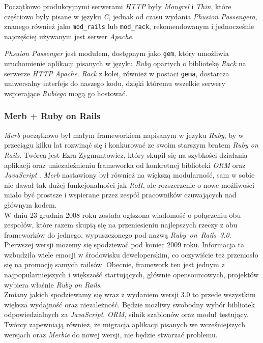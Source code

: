 \documentclass[a4paper,12pt]{article}
\begin{document}
Początkowo produkcyjnymi serwerami \emph{HTTP} były \emph{Mongrel} i \emph{Thin}, które
częściowo były pisane w języku \emph{C}, jednak od czasu wydania \emph{Phusion Passengera},
znanego również jako \texttt{mod\_rails} lub \texttt{mod\_rack}, rekomendowanym i
jednocześnie najczęściej używanym jest serwer \emph{Apache}.


\emph{Phsuion Passenger} jest modułem, dostępnym jako \texttt{gem}, który umożliwia
uruchomienie aplikacji pisanych w języku \emph{Ruby} opartych o bibliotekę \emph{Rack} na
serwerze \emph{HTTP} \emph{Apache}. \emph{Rack} z kolei, również w postaci \texttt{gema},
dostarcza uniwersalny interfejs do naszego kodu, dzięki któremu wszelkie serwery
wspierające \emph{Rubiego} mogą go hostować.


\subsubsection{Merb + Ruby on Rails}
\emph{Merb} początkowo był małym frameworkiem napisanym w języku \emph{Ruby}, by w
przeciągu kilku lat rozwinąć się i konkurować ze swoim starszym bratem \emph{Ruby on
Rails}. Twórcą jest Ezra Zygmuntowicz, który skupił się na szybkości działania aplikacji
oraz uniezależnieniu frameworka od konkretnej biblioteki \emph{ORM} oraz \emph{JavaScript
}. \emph{Merb} nastawiony był również na większą modularność, sam w sobie nie dawał tak
dużej funkcjonalności jak \emph{RoR}, ale rozszerzenie o nowe możliwości miało być
prostsze i wspierane przez zespół pracowników czuwających nad głównym kodem.\\
W dniu 23 grudnia 2008 roku została ogłszona wiadomość \cite{rails-merb} o połączeniu obu zespołów,
które razem skupią się na przeniesieniu najlepszych rzeczy z obu frameworków do jednego,
wypuszczonego pod nazwą \emph{Ruby~on~Rails~3.0}. Pierwszej wersji możemy się spodziewać
pod koniec 2009 roku. Informacja ta wzbudziła wiele emocji w środowisku deweloperskim, co
oczywiście też przeniosło się na promocję samych railsów. Obecnie, framework ten jest
jednym z najpopularniejszych i większość startujących, głównie opensourcowych,
projektów wybiera właśnie \emph{Ruby on Rails}.\\
Zmiany jakich spodziewamy się wraz z wydaniem wersji 3.0 to przede wszystkim większa
wydajność oraz niezależność. Będzie możliwy swobodny wybór bibliotek odpowiedzialnych za
\emph{JavaScript}, \emph{ORM}, silnik szablonów oraz moduł testujący. Twórcy zapewniają
również, że migracja aplikacji pisanych we wcześniejszych wersjach oraz \emph{Merbie} do nowej
wersji, nie będzie stwarzać problemu.
\end{document}
